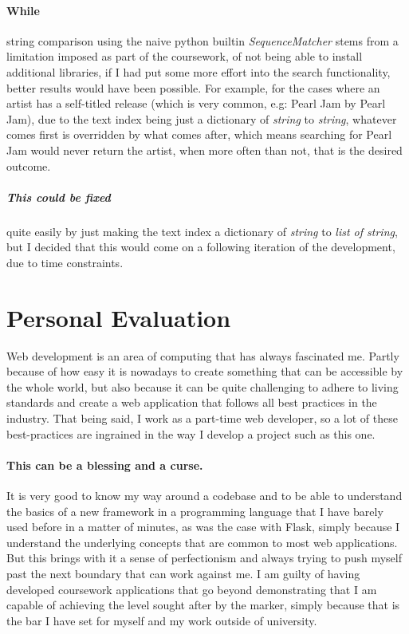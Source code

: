 \documentclass[10pt, a4paper]{article}
\begin{document}
	\paragraph{While} string comparison using the naive python builtin \textit{SequenceMatcher}  stems from a limitation imposed as part of the coursework, of not being able to install additional libraries, if I had put some more effort into the search functionality, better results would have been possible. For example, for the cases where an artist has a self-titled release (which is very common, e.g: Pearl Jam by Pearl Jam), due to the text index being just a dictionary of \textit{string} to \textit{string}, whatever comes first is overridden by what comes after, which means searching for Pearl Jam would never return the artist, when more often than not, that is the desired outcome.
	\subparagraph{This could be fixed} quite easily by just making the text index a dictionary of \textit{string} to \textit{list of string}, but I decided that this would come on a following iteration of the development, due to time constraints.
	
\section{Personal Evaluation}
	Web development is an area of computing that has always fascinated me. Partly because of how easy it is nowadays to create something that can be accessible by the whole world, but also because it can be quite challenging to adhere to living standards and create a web application that follows all best practices in the industry.
	That being said, I work as a part-time web developer, so a lot of these best-practices are ingrained in the way I develop a project such as this one.
	\paragraph{This can be a blessing and a curse.} It is very good to know my way around a codebase and to be able to understand the basics of a new framework in a programming language that I have barely used before in a matter of minutes, as was the case with Flask, simply because I understand the underlying concepts that are common to most web applications. But this brings with it a sense of perfectionism and always trying to push myself past the next boundary that can work against me. I am guilty of having developed coursework applications that go beyond demonstrating that I am capable of achieving the level sought after by the marker, simply because that is the bar I have set for myself and my work outside of university.
\end{document}
